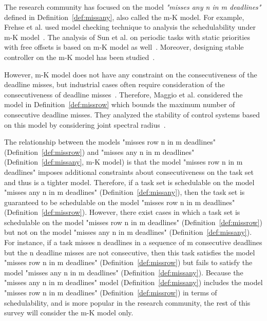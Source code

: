 The research community has focused on the model \emph{"misses any n in m deadlines"} defined in Definition~\ref{def:missany}, also called the m-K model. For example, Frehse et al. used model checking technique to analysis the schedulability under m-K model~\cite{frehse2014formal}. The analysis of Sun et al. on periodic tasks with static priorities with free offsets is based on m-K model as well~\cite{sun2017weakly}. Moreover, designing stable controller on the m-K model has been studied~\cite{linsenmayer2017stabilization}. 

However, m-K model does not have any constraint on the consecutiveness of the deadline misses, but industrial cases often require consideration of the consecutiveness of deadline misses~\cite{maggio2020control}. Therefore, Maggio et al. considered the model in Definition~\ref{def:missrow} which bounds the maximum number of consecutive deadline misses. They analyzed the stability of control systems based on this model by considering joint spectral radius~\cite{maggio2020control}. 

The relationship between the models "misses row n in m deadlines" (Definition~\ref{def:missrow}) and "misses any n in m deadlines" (Definition~\ref{def:missany}, m-K model) is that the model "misses row n in m deadlines" imposes additional constraints about consecutiveness on the task set and thus is a tighter model. Therefore, if a task set is schedulable on the model "misses any n in m deadlines" (Definition~\ref{def:missany}), then the task set is guaranteed to be schedulable on the model "misses row n in m deadlines" (Definition~\ref{def:missrow}). However, there exist cases in which a task set is schedulable on the model "misses row n in m deadlines" (Definition~\ref{def:missrow}) but not on the model "misses any n in m deadlines" (Definition~\ref{def:missany}). For instance, if a task misses n deadlines in a sequence of m consecutive deadlines but the n deadline misses are not consecutive, then this task satisfies the model "misses row n in m deadlines" (Definition~\ref{def:missrow}) but fails to satisfy the model "misses any n in m deadlines" (Definition~\ref{def:missany}). Because the "misses any n in m deadlines" model (Definition~\ref{def:missany}) includes the model "misses row n in m deadlines" (Definition~\ref{def:missrow}) in terms of schedulability, and is more popular in the research community, the rest of this survey will consider the m-K model only.



































